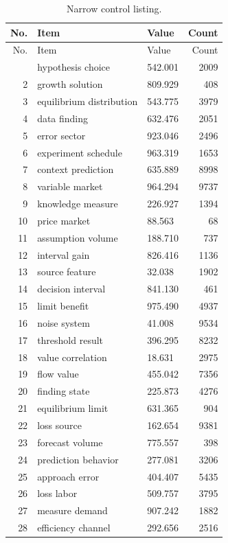 \documentclass[11pt]{report}
\begin{document}
\begin{longtable}{rllr}\caption{Narrow control listing.}\label{tab:l2}\\\toprule No. & Item & Value & Count \\ \midrule \endfirsthead\toprule No. & Item & Value & Count \\ \midrule \endhead\bottomrule \endfoot
1 & hypothesis choice & 542.001 & 2009 \\
2 & growth solution & 809.929 & 408 \\
3 & equilibrium distribution & 543.775 & 3979 \\
4 & data finding & 632.476 & 2051 \\
5 & error sector & 923.046 & 2496 \\
6 & experiment schedule & 963.319 & 1653 \\
7 & context prediction & 635.889 & 8998 \\
8 & variable market & 964.294 & 9737 \\
9 & knowledge measure & 226.927 & 1394 \\
10 & price market & 88.563 & 68 \\
11 & assumption volume & 188.710 & 737 \\
12 & interval gain & 826.416 & 1136 \\
13 & source feature & 32.038 & 1902 \\
14 & decision interval & 841.130 & 461 \\
15 & limit benefit & 975.490 & 4937 \\
16 & noise system & 41.008 & 9534 \\
17 & threshold result & 396.295 & 8232 \\
18 & value correlation & 18.631 & 2975 \\
19 & flow value & 455.042 & 7356 \\
20 & finding state & 225.873 & 4276 \\
21 & equilibrium limit & 631.365 & 904 \\
22 & loss source & 162.654 & 9381 \\
23 & forecast volume & 775.557 & 398 \\
24 & prediction behavior & 277.081 & 3206 \\
25 & approach error & 404.407 & 5435 \\
26 & loss labor & 509.757 & 3795 \\
27 & measure demand & 907.242 & 1882 \\
28 & efficiency channel & 292.656 & 2516 \\

\end{longtable}
\end{document}
